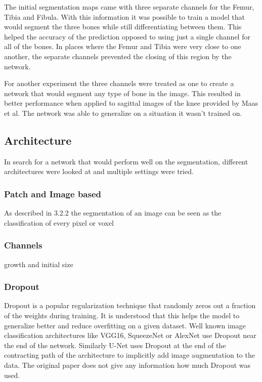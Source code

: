 The initial segmentation maps came with three separate channels for the Femur, Tibia and Fibula. With this information it was possible to train a model that would segment the three bones while still differentiating between them. This helped the accuracy of the prediction opposed to using just a single channel for all of the bones. In places where the Femur and Tibia were very close to one another, the separate channels prevented the closing of this region by the network.

For another experiment the three channels were treated as one to create a network that would segment any type of bone in the image. This resulted in better performance when applied to sagittal images of the knee provided by Maas et al. The network was able to generalize on a situation it wasn't trained on.

\subsection{Architecture}



In search for a network that would perform well on the segmentation, different architectures were looked at and multiple settings were tried.

\subsubsection{Patch and Image based}

As described in 3.2.2 the segmentation of an image can be seen as the classification of every pixel or voxel


\subsubsection{Channels}

growth and initial size

\subsubsection{Dropout}

Dropout is a popular regularization technique that randomly zeros out a fraction of the weights during training. It is understood that this helps the model to generalize better and reduce overfitting on a given dataset. Well known image classification architectures like VGG16, SqueezeNet or AlexNet use Dropout near the end of the network. Similarly U-Net uses Dropout at the end of the contracting path of the architecture to implicitly add image augmentation to the data. The original paper does not give any information how much Dropout was used.

